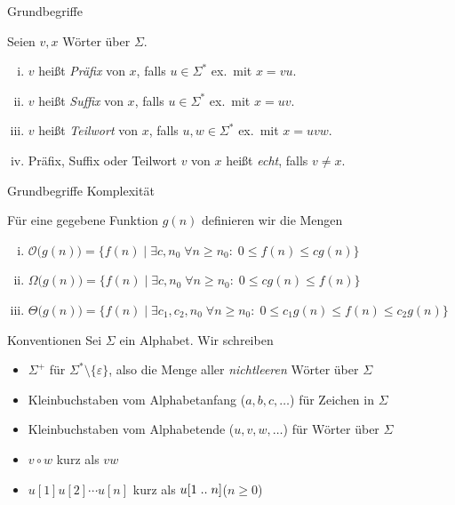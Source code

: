 \documentclass[xcolor=dvipsnames, aspectratio=1610]{beamer}
\begin{document}
\begin{frame}[<+->]{Grundbegriffe}
\begin{defi}
Seien $v,x$ Wörter über $\Sigma$.
\begin{enumerate}[(i)]
\item $v$ heißt \textit{Präfix} von $x$, falls $u\in\Sigma^*$ ex.\ mit $x=vu$.
\item $v$ heißt \textit{Suffix} von $x$, falls $u\in\Sigma^*$ ex.\ mit $x=uv$.
\item $v$ heißt \textit{Teilwort} von $x$, falls $u,w\in\Sigma^*$ ex.\ mit $x=uvw$.
\item Präfix, Suffix oder Teilwort $v$ von $x$ heißt \textit{echt}, falls $v\neq x$.
\end{enumerate}
\end{defi}
\end{frame}

\begin{frame}[<+->]{Grundbegriffe Komplexität}
\begin{defi}
Für eine gegebene Funktion $g(n)$ definieren wir die Mengen
\begin{enumerate}[(i)]
\item $\mathcal{O}\big(g(n)\big)=\big\{f(n)\;\big\vert\;\exists c,n_0\;\forall n\geq n_0 :\; 0\leq f(n)\leq cg(n)\big\}$
\item $\Omega\big(g(n)\big)=\big\{f(n)\;\big\vert\;\exists c,n_0\;\forall n\geq n_0 :\; 0\leq cg(n)\leq f(n)\big\}$
\item $\Theta\big(g(n)\big)=\big\{f(n)\;\big\vert\;\exists c_1,c_2,n_0\;\forall n\geq n_0 :\; 0\leq c_1g(n)\leq f(n)\leq c_2g(n)\big\}$
\end{enumerate}
\end{defi}\medskip
{}
\end{frame}

\begin{frame}[<+->]{Konventionen}
Sei $\Sigma$ ein Alphabet. Wir schreiben\bigskip

\begin{itemize}
\item $\Sigma^+$ für $\Sigma^*\setminus \{\varepsilon\}$, also die Menge aller \textit{nichtleeren} Wörter über $\Sigma$
\item Kleinbuchstaben vom Alphabetanfang ($a,b,c,\dots$) für Zeichen in $\Sigma$
\item Kleinbuchstaben vom Alphabetende ($u, v, w,\dots$) für Wörter über $\Sigma$
\item $v\circ w$ kurz als $vw$
\item $u[1] u[2] \cdots u[n]$ kurz als $u[1 \; ..\; n]$\hfill ($n\geq 0$)

\end{itemize}
\end{frame}
\end{document}
